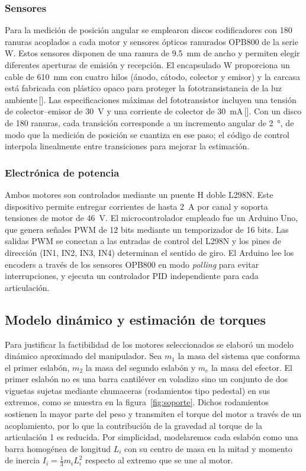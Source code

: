 \documentclass[11pt,a4paper]{article}
\begin{document}
\subsubsection{Sensores}

Para la medición de posición angular se emplearon discos codificadores con \SI{180}{} ranuras acoplados a cada motor y sensores ópticos ranurados OPB800 de la serie W.  Estos sensores disponen de una ranura de \SI{9.5}{\milli\metre} de ancho y permiten elegir diferentes aperturas de emisión y recepción.  El encapsulado W proporciona un cable de \SI{610}{\milli\metre} con cuatro hilos (ánodo, cátodo, colector y emisor) y la carcasa está fabricada con plástico opaco para proteger la fototransistancia de la luz ambiente\,[\!\cite{opb800}].  Las especificaciones máximas del fototransistor incluyen una tensión de colector–emisor de \SI{30}{\volt} y una corriente de colector de \SI{30}{\milli\ampere}\,[\!\cite{opb800}].  Con un disco de \SI{180}{} ranuras, cada transición corresponde a un incremento angular de \SI{2}{\degree}, de modo que la medición de posición se cuantiza en ese paso; el código de control interpola linealmente entre transiciones para mejorar la estimación.

\subsubsection{Electrónica de potencia}

Ambos motores son controlados mediante un puente H doble L298N.  Este dispositivo permite entregar corrientes de hasta \SI{2}{\ampere} por canal y soporta tensiones de motor de \SI{46}{\volt}.  El microcontrolador empleado fue un Arduino Uno, que genera señales PWM de 12 bits mediante un temporizador de 16 bits.  Las salidas PWM se conectan a las entradas de control del L298N y los pines de dirección (IN1, IN2, IN3, IN4) determinan el sentido de giro.  El Arduino lee los encoders a través de los sensores OPB800 en modo \emph{polling} para evitar interrupciones, y ejecuta un controlador PID independiente para cada articulación.

\subsection{Modelo dinámico y estimación de torques}

Para justificar la factibilidad de los motores seleccionados se elaboró un modelo dinámico aproximado del manipulador.  Sea $m_1$ la masa del sistema que conforma el primer eslabón, $m_2$ la masa del segundo eslabón y $m_e$ la masa del efector.  El primer eslabón no es una barra cantiléver en voladizo sino un conjunto de dos viguetas sujetas mediante chumaceras (rodamientos tipo pedestal) en sus extremos, como se muestra en la figura~\ref{fig:soporte}.  Dichos rodamientos sostienen la mayor parte del peso y transmiten el torque del motor a través de un acoplamiento, por lo que la contribución de la gravedad al torque de la articulación 1 es reducida.  Por simplicidad, modelaremos cada eslabón como una barra homogénea de longitud $L_i$ con su centro de masa en la mitad y momento de inercia $I_i = \tfrac{1}{3} m_i L_i^2$ respecto al extremo que se une al motor.
\end{document}
